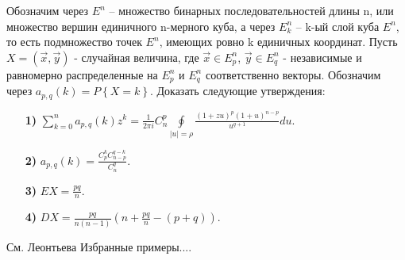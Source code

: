 \begin{problem} 
Обозначим через $E^n$ -- множество бинарных последовательностей длины n, или множество вершин 
единичного n-мерного куба, а через $E_k^n $ -- k-ый слой куба $E^n$, то есть 
подмножество точек $E^n$, имеющих ровно k единичных координат. Пусть 
$X=\left( {\vec {x},\vec {y}} \right)$ - случайная величина, где $\vec 
{x}\in E_p^n $, $\vec {y}\in E_q^n $ - независимые и равномерно 
распределенные на $E_p^n $ и $E_q^n $ соответственно векторы. Обозначим 
через $a_{p,q} (k)=P\left\{ {X=k} \right\}$. Доказать следующие утверждения:

\begin{enumerate}
\item[\textbf{1)}] $\sum\limits_{k=0}^n {a_{p,q} (k)z^k} =\frac{1}{2\pi i}C_n^p 
\oint\limits_{\left| u \right|=\rho } 
{\frac{(1+zu)^p(1+u)^{n-p}}{u^{q+1}}du} $.

\item[\textbf{2)}] $a_{p,q} (k)=\frac{C_p^k C_{n-p}^{q-k} }{C_n^q }$.

\item[\textbf{3)}] $EX=\frac{pq}{n}$.

\item[\textbf{4)}] $DX=\frac{pq}{n(n-1)}\left( {n+\frac{pq}{n}-(p+q)} \right)$.
\end{enumerate}
\end{problem}

\begin{fixme}
См. Леонтьева Избранные примеры.... 
\end{fixme}









